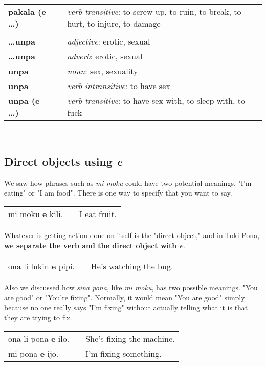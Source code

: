 \begin{supertabular}{p{2,5cm}|ll}
\textbf{pakala (e \dots)} && \textit{verb transitive}: to screw up, to ruin, to break, to hurt, to injure, to damage \\ %
 && \\ %
\textbf{\dots unpa} && \textit{adjective}: erotic, sexual \\ %
\textbf{\dots unpa} && \textit{adverb}: erotic, sexual \\ %
\textbf{unpa} && \textit{noun}: sex, sexuality \\ %
\textbf{unpa} && \textit{verb intransitive}: to have sex \\ %
\textbf{unpa (e \dots)} && \textit{verb transitive}: to have sex with, to sleep with, to fuck \\ %
\end{supertabular} \\
%
\subsection*{Direct objects using \textit{e}}
%
We saw how phrases such as \textit{mi moku} could have two potential meanings. 
"I'm eating" or "I am food". 
There is one way to specify that you want to say. 

\begin{supertabular}{p{5,5cm}|ll}
mi moku \textbf{e} kili. && I eat fruit. \\
\end{supertabular} 

Whatever is getting action done on itself is the "direct object," and in Toki Pona, \textbf{we separate the verb and the direct object with \textit{e}}. 

\begin{supertabular}{p{5,5cm}|ll}
ona li lukin \textbf{e} pipi. && He's watching the bug. \\
\end{supertabular} 

Also we discussed how \textit{sina pona}, like \textit{mi moku}, has two possible meanings. "You are good" or "You're fixing". 
Normally, it would mean "You are good" simply because no one really says "I'm fixing" without actually telling what it is that they are trying to fix. 

\begin{supertabular}{p{5,5cm}|ll}
ona li pona \textbf{e} ilo. && She's fixing the machine. \\
mi pona \textbf{e} ijo. && I'm fixing something. \\
\end{supertabular} 


